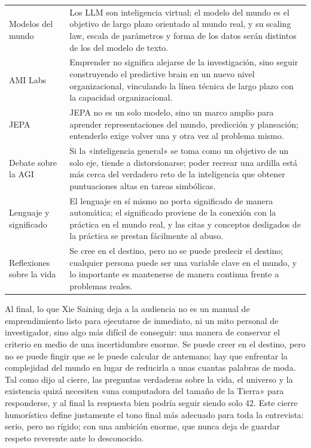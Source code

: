 \documentclass[a4paper,12pt]{article}
\begin{document}
\begin{longtable}{>{\raggedright\arraybackslash}p{} >{\raggedright\arraybackslash}p{}}
Modelos del mundo & Los LLM son inteligencia virtual; el modelo del mundo es el objetivo de largo plazo orientado al mundo real, y su scaling law, escala de parámetros y forma de los datos serán distintos de los del modelo de texto. \\
AMI Labs & Emprender no significa alejarse de la investigación, sino seguir construyendo el predictive brain en un nuevo nivel organizacional, vinculando la línea técnica de largo plazo con la capacidad organizacional. \\
JEPA & JEPA no es un solo modelo, sino un marco amplio para aprender representaciones del mundo, predicción y planeación; entenderlo exige volver una y otra vez al problema mismo. \\
Debate sobre la AGI & Si la «inteligencia general» se toma como un objetivo de un solo eje, tiende a distorsionarse; poder recrear una ardilla está más cerca del verdadero reto de la inteligencia que obtener puntuaciones altas en tareas simbólicas. \\
Lenguaje y significado & El lenguaje en sí mismo no porta significado de manera automática; el significado proviene de la conexión con la práctica en el mundo real, y las citas y conceptos desligados de la práctica se prestan fácilmente al abuso. \\
Reflexiones sobre la vida & Se cree en el destino, pero no se puede predecir el destino; cualquier persona puede ser una variable clave en el mundo, y lo importante es mantenerse de manera continua frente a problemas reales. \\
\bottomrule
\end{longtable}

Al final, lo que Xie Saining deja a la audiencia no es un manual de emprendimiento listo para ejecutarse de inmediato, ni un mito personal de investigador, sino algo más difícil de conseguir: una manera de conservar el criterio en medio de una incertidumbre enorme. Se puede creer en el destino, pero no se puede fingir que se le puede calcular de antemano; hay que enfrentar la complejidad del mundo en lugar de reducirla a unas cuantas palabras de moda. Tal como dijo al cierre, las preguntas verdaderas sobre la vida, el universo y la existencia quizá necesiten «una computadora del tamaño de la Tierra» para responderse, y al final la respuesta bien podría seguir siendo solo 42. Este cierre humorístico define justamente el tono final más adecuado para toda la entrevista: serio, pero no rígido; con una ambición enorme, que nunca deja de guardar respeto reverente ante lo desconocido.
\end{document}
